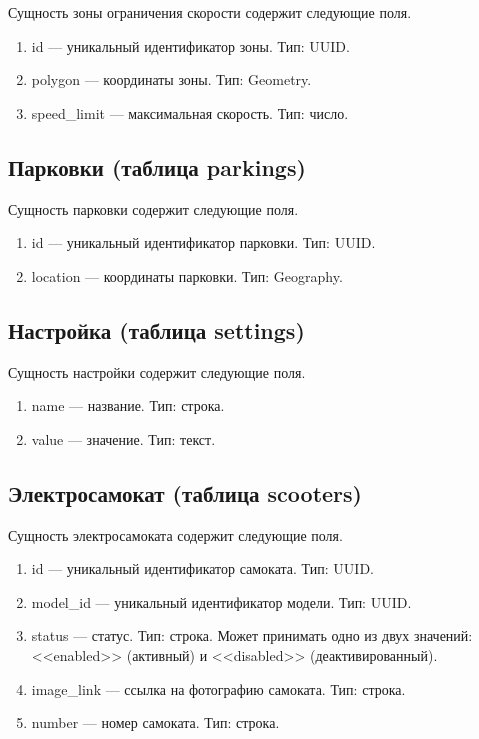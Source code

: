 Сущность зоны ограничения скорости содержит следующие поля.

\begin{enumerate}
    \item id --- уникальный идентификатор зоны. Тип: UUID. 
    \item polygon --- координаты зоны. Тип: Geometry.
    \item speed\_limit --- максимальная скорость. Тип: число.
\end{enumerate}

\subsection{Парковки (таблица parkings)}

Сущность парковки содержит следующие поля.

\begin{enumerate}
    \item id --- уникальный идентификатор парковки. Тип: UUID.
    \item location --- координаты парковки. Тип: Geography.
\end{enumerate}

\subsection{Настройка (таблица settings)}

Сущность настройки содержит следующие поля.

\begin{enumerate}
    \item name --- название. Тип: строка.
    \item value --- значение. Тип: текст.
\end{enumerate}

\subsection{Электросамокат (таблица scooters)}

Сущность электросамоката содержит следующие поля.

\begin{enumerate}
    \item id --- уникальный идентификатор самоката. Тип: UUID.
    \item model\_id --- уникальный идентификатор модели. Тип: UUID.
    \item status --- статус. Тип: строка. Может принимать одно из двух значений: <<enabled>> (активный) и <<disabled>> (деактивированный).
    \item image\_link --- ссылка на фотографию самоката. Тип: строка.
    \item number --- номер самоката. Тип: строка.
\end{enumerate}

